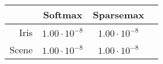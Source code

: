 \begin{tabular}{r|ccc}
& Softmax & Sparsemax \\
\hline
Iris & $1.00 \cdot 10^{-8}$ & $1.00 \cdot 10^{-8}$ \\
Scene & $1.00 \cdot 10^{-8}$ & $1.00 \cdot 10^{-8}$ \\
\end{tabular}
